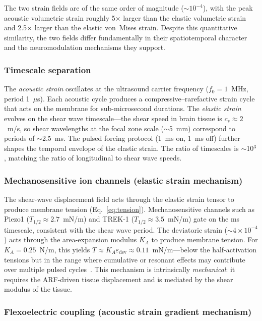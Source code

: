 \documentclass[11pt]{article}
\begin{document}
\noindent
The two strain fields are of the same order of magnitude ($\sim 10^{-4}$),
with the peak acoustic volumetric strain roughly 5$\times$ larger than the
elastic volumetric strain and 2.5$\times$ larger than the elastic von~Mises
strain.  Despite this quantitative similarity, the two fields differ
fundamentally in their spatiotemporal character and the neuromodulation
mechanisms they support.

\subsubsection{Timescale separation}

The \emph{acoustic strain} oscillates at the ultrasound carrier frequency
($f_0 = 1$~MHz, period 1~$\mu$s).  Each acoustic cycle produces a
compressive--rarefactive strain cycle that acts on the membrane for
sub-microsecond durations.  The \emph{elastic strain} evolves on the shear
wave timescale---the shear speed in brain tissue is $c_s \approx 2$~m/s, so
shear wavelengths at the focal zone scale ($\sim$5~mm) correspond to
periods of $\sim$2.5~ms.  The pulsed forcing protocol (1~ms on, 1~ms off)
further shapes the temporal envelope of the elastic strain.  The ratio of
timescales is $\sim$10$^3$, matching the ratio of longitudinal to shear wave
speeds.

\subsubsection{Mechanosensitive ion channels (elastic strain mechanism)}

The shear-wave displacement field acts through the elastic strain tensor to
produce membrane tension (Eq.~\ref{eq:tension}).  Mechanosensitive channels
such as Piezo1 ($T_{1/2} \approx 2.7$~mN/m) and TREK-1 ($T_{1/2} \approx
3.5$~mN/m) gate on the ms timescale, consistent with the shear wave period.
The deviatoric strain ($\sim 4 \times 10^{-4}$) acts through the
area-expansion modulus $K_A$ to produce membrane tension.  For $K_A =
0.25$~N/m, this yields $T \approx K_A \varepsilon_{\mathrm{dev}} \approx
0.11$~mN/m---below the half-activation tensions but in the range where
cumulative or resonant effects may contribute over multiple pulsed
cycles~\cite{kubanek2018neuromodulation}.  This mechanism is intrinsically
\emph{mechanical}: it requires the ARF-driven tissue displacement and is
mediated by the shear modulus of the tissue.

\subsubsection{Flexoelectric coupling (acoustic strain gradient mechanism)}
\end{document}
